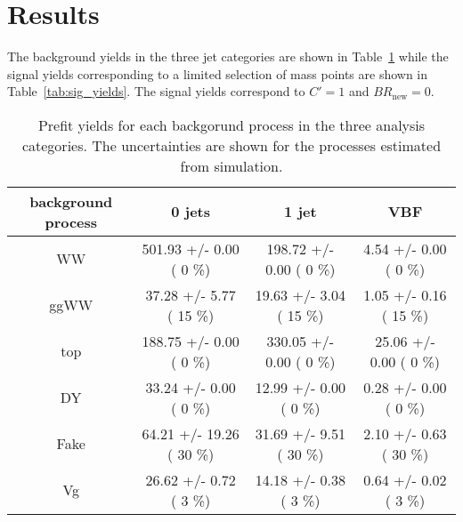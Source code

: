 \section{Results}\label{sec:results}

The background yields in the three jet categories are shown in Table~\ref{tab:bkg_yields} while the signal yields corresponding to a limited selection of mass points are shown in Table~\ref{tab:sig_yields}. The signal yields correspond to $C'=1$ and $BR_\mathrm{new} = 0$.

\begin{table}[h!]\begin{center}
\caption{Prefit yields for each backgorund process in the three analysis categories. The uncertainties are shown for the processes estimated from simulation.}\label{tab:bkg_yields}
\small{\begin{tabular}{
c| c | c | c } \hline
             background process           &         0 jets                                          &          1 jet                                         &        VBF                                           \\ \hline
      WW                &    501.93 +/-       0.00 (         0 \%)              &     198.72 +/-       0.00 (         0 \%)             &      4.54 +/-       0.00 (         0 \%)               \\
      ggWW                &     37.28 +/-       5.77 (        15 \%)              &      19.63 +/-       3.04 (        15 \%)             &      1.05 +/-       0.16 (        15 \%)               \\
      top                &    188.75 +/-       0.00 (         0 \%)              &     330.05 +/-       0.00 (         0 \%)             &     25.06 +/-       0.00 (         0 \%)               \\
      DY                &     33.24 +/-       0.00 (         0 \%)              &      12.99 +/-       0.00 (         0 \%)             &      0.28 +/-       0.00 (         0 \%)               \\
      Fake                &     64.21 +/-      19.26 (        30 \%)              &      31.69 +/-       9.51 (        30 \%)             &      2.10 +/-       0.63 (        30 \%)               \\
      Vg                &     26.62 +/-       0.72 (         3 \%)              &      14.18 +/-       0.38 (         3 \%)             &      0.64 +/-       0.02 (         3 \%)               \\

\end{tabular}}
\end{center}
\end{table}
